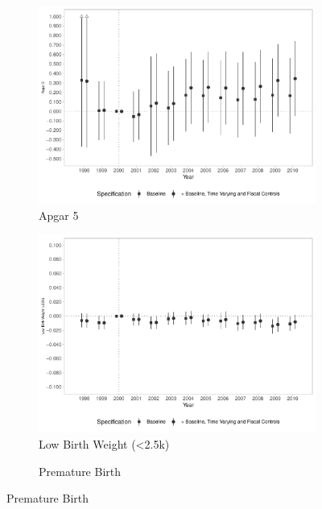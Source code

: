 \begin{figure}[h!]
\begin{center}
    \begin{subfigure}{0.32\textwidth}
        \centering
        \caption{\scriptsize Apgar 5}\label{fig:18c}
        \includegraphics[width=\textwidth]{plots/birth_apgar5_dist_ec29_baseline_dist_ec29_baseline_18.pdf}
    \end{subfigure}
    \begin{subfigure}{0.32\textwidth}
        \caption{\scriptsize Low Birth Weight (<2.5k)}\label{fig:18d}
        \centering
        \includegraphics[width=\textwidth]{plots/birth_low_weight_2500g_dist_ec29_baseline_dist_ec29_baseline_18.pdf}
    \end{subfigure}
    \begin{subfigure}{0.32\textwidth}
        \centering
        \caption{\scriptsize Premature Birth}\label{fig:18e}

\end{subfigure}
\end{center}
\end{figure}

